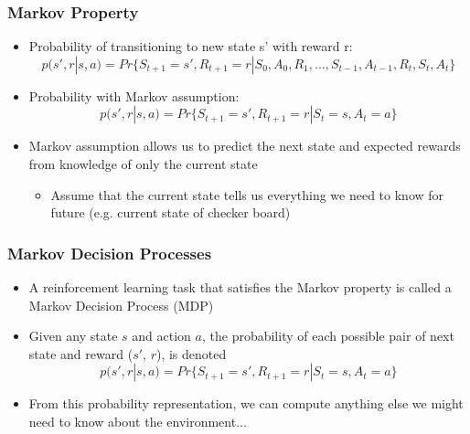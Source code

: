 \documentclass{beamer}
\begin{document}

\begin{frame}
\frametitle{Markov Property}
\begin{itemize}
\item Probability of transitioning to new state s' with reward r:
\small
\begin{equation}
p(s',r | s,a)=Pr\{S_{t+1}=s', R_{t+1}=r|S_0, A_0, R_1,...,S_{t-1},A_{t-1},R_t, S_t, A_t\}
\nonumber
\end{equation}
\normalsize
\item Probability with Markov assumption:
\begin{equation}
p(s',r | s,a) = Pr\{S_{t+1} = s', R_{t+1} = r | S_t = s, A_t = a\}
\nonumber
\end{equation}
\item Markov assumption allows us to predict the next state and expected rewards from knowledge of only the current state
   \begin{itemize}
   	\item Assume that the current state tells us everything we need to know for future (e.g. current state of checker board)
      \end{itemize}
\end{itemize}
\end{frame}




\begin{frame}
\frametitle{Markov Decision Processes}
\begin{itemize}
\item A reinforcement learning task that satisfies the Markov property is called a Markov Decision Process (MDP)
\item Given any state $s$ and action $a$, the probability of each possible pair of next state and reward ($s'$, $r$), is denoted
\begin{equation}
p(s',r | s,a) = Pr\{S_{t+1} = s', R_{t+1} = r | S_t = s, A_t = a\}
\nonumber
\end{equation}
\item From this probability representation, we can compute anything else we might need to know about the environment...
\end{itemize}
\end{frame}
\end{document}
